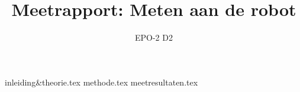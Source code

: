 \documentclass{thema}
\title{Meetrapport: Meten aan de robot}
\author{EPO-2 D2}
\begin{document}
\maketitle
\tableofcontents
{inleiding&theorie.tex}
{methode.tex}
{meetresultaten.tex}
\end{document}
